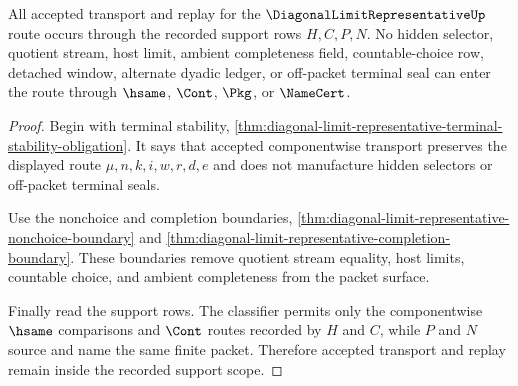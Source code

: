 \begin{theorem}
\label{thm:diagonal-limit-representative-hsame-cont-scope}
All accepted transport and replay for the $\DiagonalLimitRepresentativeUp$ route occurs through the recorded support rows $H,C,P,N$. No hidden selector, quotient stream, host limit, ambient completeness field, countable-choice row, detached window, alternate dyadic ledger, or off-packet terminal seal can enter the route through $\hsame$, $\Cont$, $\Pkg$, or $\NameCert$.
\end{theorem}
\begin{proof}
Begin with terminal stability, \autoref{thm:diagonal-limit-representative-terminal-stability-obligation}. It says that accepted componentwise transport preserves the displayed route $\mu,n,k,i,w,r,d,e$ and does not manufacture hidden selectors or off-packet terminal seals.

Use the nonchoice and completion boundaries, \autoref{thm:diagonal-limit-representative-nonchoice-boundary} and \autoref{thm:diagonal-limit-representative-completion-boundary}. These boundaries remove quotient stream equality, host limits, countable choice, and ambient completeness from the packet surface.

Finally read the support rows. The classifier permits only the componentwise $\hsame$ comparisons and $\Cont$ routes recorded by $H$ and $C$, while $P$ and $N$ source and name the same finite packet. Therefore accepted transport and replay remain inside the recorded support scope.
\end{proof}

